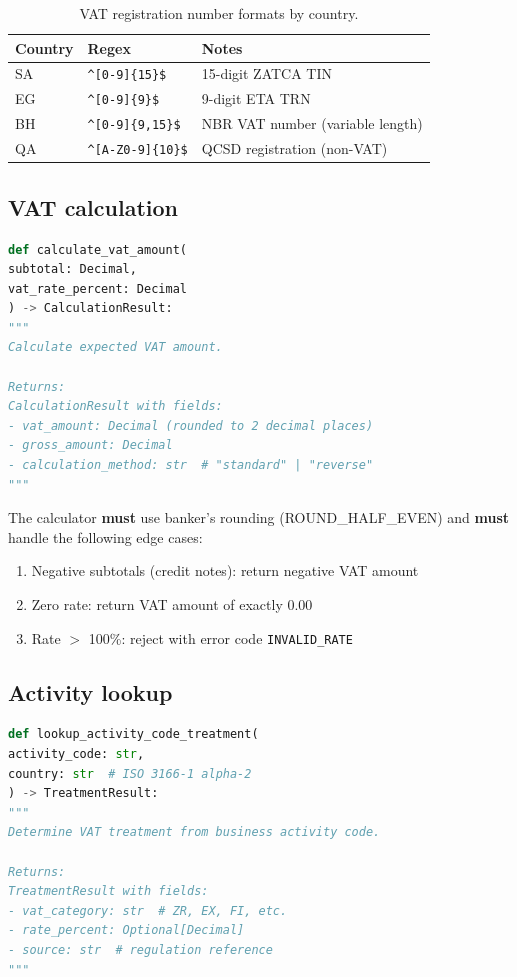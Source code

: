 \documentclass[11pt,a4paper,twoside]{report}
\begin{document}
\begin{table}[htbp]
\centering
\caption{VAT registration number formats by country.}
\label{tab:vat-formats}
\footnotesize
\begin{tabularx}{\linewidth}{@{}l l X@{}}
\toprule
\textbf{Country} & \textbf{Regex} & \textbf{Notes} \\ \midrule
SA & \verb|^[0-9]{15}$| & 15-digit ZATCA TIN \\
EG & \verb|^[0-9]{9}$| & 9-digit ETA TRN \\
BH & \verb|^[0-9]{9,15}$| & NBR VAT number (variable length) \\
QA & \verb|^[A-Z0-9]{10}$| & QCSD registration (non-VAT) \\
\bottomrule
\end{tabularx}
\end{table}

\subsection{VAT calculation}

\begin{lstlisting}[language=Python,basicstyle=\ttfamily\small,caption={VAT calculator API contract.}]
def calculate_vat_amount(
subtotal: Decimal,
vat_rate_percent: Decimal
) -> CalculationResult:
"""
Calculate expected VAT amount.

Returns:
CalculationResult with fields:
- vat_amount: Decimal (rounded to 2 decimal places)
- gross_amount: Decimal
- calculation_method: str  # "standard" | "reverse"
"""
\end{lstlisting}

The calculator \textbf{must} use banker's rounding (ROUND\_HALF\_EVEN) and
\textbf{must} handle the following edge cases:

\begin{enumerate}
\item Negative subtotals (credit notes): return negative VAT amount
\item Zero rate: return VAT amount of exactly 0.00
\item Rate $>$ 100\%: reject with error code \texttt{INVALID\_RATE}
\end{enumerate}

\subsection{Activity lookup}

\begin{lstlisting}[language=Python,basicstyle=\ttfamily\small,caption={Activity lookup API contract.}]
def lookup_activity_code_treatment(
activity_code: str,
country: str  # ISO 3166-1 alpha-2
) -> TreatmentResult:
"""
Determine VAT treatment from business activity code.

Returns:
TreatmentResult with fields:
- vat_category: str  # ZR, EX, FI, etc.
- rate_percent: Optional[Decimal]
- source: str  # regulation reference
"""
\end{lstlisting}
\end{document}

